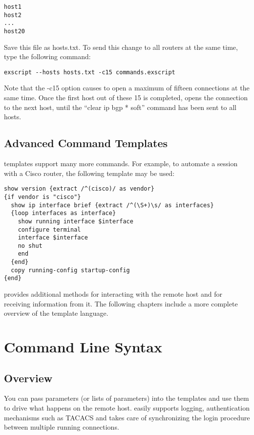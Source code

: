 \begin{lstlisting}
host1
host2
...
host20
\end{lstlisting}

Save this file as hosts.txt. To send this change to all routers at the same 
time, type the following command: 

\begin{lstlisting}
exscript --hosts hosts.txt -c15 commands.exscript
\end{lstlisting}

Note that the -c15 option causes \product to open a maximum of fifteen 
connections at the same time. Once the first host out of these 15 is 
completed, \product opens the connection to the next host, until the 
``clear ip bgp * soft'' command has been sent to all hosts. 


\subsection{Advanced Command Templates}

\product templates support many more commands. For example, to automate a 
session with a Cisco router, the following template may be used: 

\begin{lstlisting}
show version {extract /^(cisco)/ as vendor}
{if vendor is "cisco"}
  show ip interface brief {extract /^(\S+)\s/ as interfaces}
  {loop interfaces as interface}
    show running interface $interface
    configure terminal
    interface $interface
    no shut
    end
  {end}
  copy running-config startup-config
{end}
\end{lstlisting}

\product provides additional methods for interacting with the remote 
host and for receiving information from it.
The following chapters include a more complete overview of the template 
language.


\section{Command Line Syntax}
\subsection{Overview}

You can pass parameters (or lists of parameters) into the templates and 
use them to drive what happens on the remote host. \product easily supports 
logging, authentication mechanisms such as TACACS and takes care of 
synchronizing the login procedure between multiple running connections.

